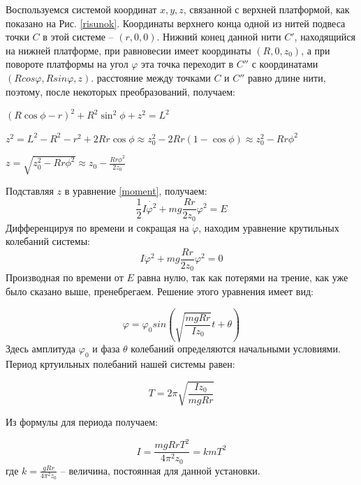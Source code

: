 \documentclass[a4paper,14pt]{extarticle}
\begin{document}
	Воспользуемся системой координат $x, y, z$, связанной с верхней платформой, как показано на Рис. \ref{risunok}. Координаты верхнего конца одной из нитей подвеса точки $C$ в этой системе -- $(r, 0, 0)$. Нижний конец данной нити $C'$, находящийся на нижней платформе, при равновесии имеет координаты $(R, 0, z_0)$, а при повороте платформы на угол $\varphi$ эта точка переходит в $C''$ с координатами $(Rcos\varphi, Rsin\varphi, z)$. расстояние между точками $C$ и $C''$ равно длине нити, поэтому, после некоторых преобразований, получаем: 
	
	\begin{center}
		$ (R\cos\phi - r)^2 + R^2\sin^2\phi + z^2 = L^2 $
		
		$ z^2 = L^2 - R^2 - r^2 + 2Rr\cos\phi \approx z^2_{0} - 2Rr(1 - \cos\phi) \approx z^2_{0} - Rr\phi^2 $
		
		$ z = \sqrt{z^2_{0} - Rr\phi^2} \approx z_{0} - \frac{Rr\phi^2}{2z_{0}} $
	\end{center}
	Подставляя $z$ в уравнение \eqref{moment}, получаем:
	\begin{equation}
		\frac{1}{2}I\dot{\varphi^2} + mg \frac{Rr}{2z_0}\varphi^2 = E
	\end{equation}
	Дифференцируя по времени и сокращая на $\dot\varphi$, находим уравнение крутильных колебаний системы:
	\begin{equation}
		I\ddot\varphi^2 + mg\frac{Rr}{2z_0}\varphi^2 = 0
	\end{equation}
	Производная по времени от $E$ равна нулю, так как потерями на трение, как уже было сказано выше, пренебрегаем.
	Решение этого уравнения имеет вид:
	
	\begin{equation}
		\varphi = \varphi_0 sin \left(\sqrt{\frac{mgRr}{Iz_0}}t + \theta\right)
	\end{equation}
	Здесь амплитуда $\varphi_0$ и фаза $\theta$ колебаний определяются начальными условиями. Период кртуильных полебаний нашей системы равен:
	
	\begin{equation}
		T = 2\pi \sqrt{\frac{Iz_0}{mgRr}}
	\end{equation}
	
	Из формулы для периода получаем:
	
	\begin{equation}\label{momin}
		I = \frac{mgRrT^2}{4 \pi^2z_0} = kmT^2
	\end{equation}
	\noindent где $k = \frac{gRr}{4\pi^2z_0}$ -- величина, постоянная для данной установки.
	
\end{document}
